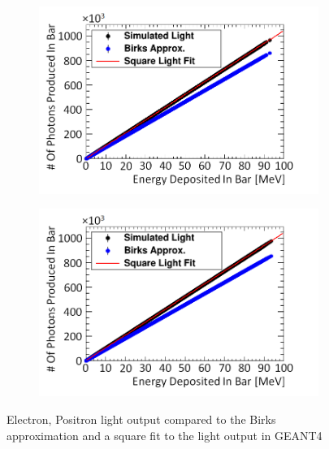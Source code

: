 \begin{figure}[!h]
\centering
\begin{subfigure}{.5\textwidth}
  \centering
  \includegraphics[width=\linewidth]{Chapter4/Figs/e-BirksSlab_simAndApproxLightMedText.png}
  \captionsetup{width=.9\linewidth}
  \caption{}
  \label{subFig:electron_light}
\end{subfigure}%
\begin{subfigure}{.5\textwidth}
  \centering
  \includegraphics[width=\linewidth]{Chapter4/Figs/e+BirksSlab_simAndApproxLightMedText.png}
  \captionsetup{width=.9\linewidth}
  \caption{}
  \label{subFig:positron_light}
\end{subfigure}
\caption{Electron, Positron light output compared to the Birks approximation and a square fit to the light output in GEANT4}
\label{fig:electron_positron_light}
\end{figure}

